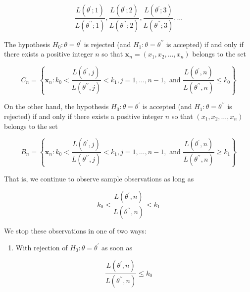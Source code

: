 $$
\frac{L\left(\theta^{\prime} ; 1\right)}{L\left(\theta^{\prime \prime} ; 1\right)}, \frac{L\left(\theta^{\prime} ; 2\right)}{L\left(\theta^{\prime \prime} ; 2\right)}, \frac{L\left(\theta^{\prime} ; 3\right)}{L\left(\theta^{\prime \prime} ; 3\right)}, \ldots
$$

The hypothesis $H_{0}: \theta=\theta^{\prime}$ is rejected (and $H_{1}: \theta=\theta^{\prime \prime}$ is accepted) if and only if there exists a positive integer $n$ so that $\mathbf{x}_{n}=\left(x_{1}, x_{2}, \ldots, x_{n}\right)$ belongs to the set


\begin{equation*}
C_{n}=\left\{\mathbf{x}_{n}: k_{0}<\frac{L\left(\theta^{\prime}, j\right)}{L\left(\theta^{\prime \prime}, j\right)}<k_{1}, j=1, \ldots, n-1, \text { and } \frac{L\left(\theta^{\prime}, n\right)}{L\left(\theta^{\prime \prime}, n\right)} \leq k_{0}\right\} \tag{8.4.1}
\end{equation*}


On the other hand, the hypothesis $H_{0}: \theta=\theta^{\prime}$ is accepted (and $H_{1}: \theta=\theta^{\prime \prime}$ is rejected) if and only if there exists a positive integer $n$ so that $\left(x_{1}, x_{2}, \ldots, x_{n}\right)$ belongs to the set


\begin{equation*}
B_{n}=\left\{\mathbf{x}_{n}: k_{0}<\frac{L\left(\theta^{\prime}, j\right)}{L\left(\theta^{\prime \prime}, j\right)}<k_{1}, j=1, \ldots, n-1, \text { and } \frac{L\left(\theta^{\prime}, n\right)}{L\left(\theta^{\prime \prime}, n\right)} \geq k_{1}\right\} \tag{8.4.2}
\end{equation*}


That is, we continue to observe sample observations as long as


\begin{equation*}
k_{0}<\frac{L\left(\theta^{\prime}, n\right)}{L\left(\theta^{\prime \prime}, n\right)}<k_{1} \tag{8.4.3}
\end{equation*}


We stop these observations in one of two ways:

\begin{enumerate}
  \item With rejection of $H_{0}: \theta=\theta^{\prime}$ as soon as
\end{enumerate}

$$
\frac{L\left(\theta^{\prime}, n\right)}{L\left(\theta^{\prime \prime}, n\right)} \leq k_{0}
$$

